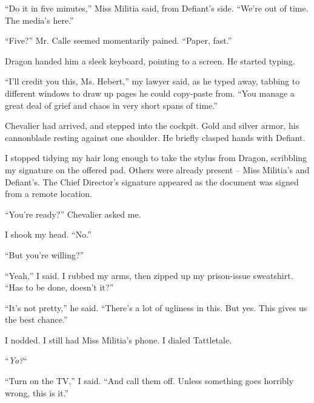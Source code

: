 ``Do it in five minutes,'' Miss Militia said, from Defiant's side.  ``We're out of time.  The media's here.''



``Five?''  Mr. Calle seemed momentarily pained.  ``Paper, fast.''



Dragon handed him a sleek keyboard, pointing to a screen.  He started typing.



``I'll credit you this, Ms. Hebert,'' my lawyer said, as he typed away, tabbing to different windows to draw up pages he could copy-paste from.  ``You manage a great deal of grief and chaos in very short spans of time.''



\sectionbreak



Chevalier had arrived, and stepped into the cockpit.  Gold and silver armor, his cannonblade resting against one shoulder.  He briefly clasped hands with Defiant.



I stopped tidying my hair long enough to take the stylus from Dragon, scribbling my signature on the offered pad.  Others were already present – Miss Militia's and Defiant's.  The Chief Director's signature appeared as the document was signed from a remote location.



``You're ready?'' Chevalier asked me.



I shook my head.  ``No.''



``But you're willing?''



``Yeah,'' I said.  I rubbed my arms, then  zipped up my prison-issue sweatshirt.  ``Has to be done, doesn't it?''



``It's not pretty,'' he said.  ``There's a lot of ugliness in this.  But yes.  This gives us the best chance.''



I nodded.  I still had Miss Militia's phone.  I dialed Tattletale.



``\emph{Yo?}``



``Turn on the TV,'' I said.  ``And call them off.  Unless something goes horribly wrong, this is it.''




